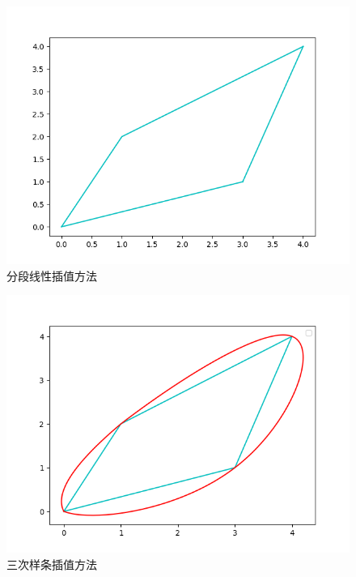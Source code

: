 \begin{figure}[htb]
    \centering

    {
        \begin{minipage}[b]{.9\linewidth}
            \centering
            \includegraphics[scale=0.6]{pic/物体轨迹/linear2.png}
        \end{minipage}
    }


    \caption{分段线性插值方法}
\end{figure}

\begin{figure}[htb]
    \centering

    {
        \begin{minipage}[b]{.9\linewidth}
            \centering
            \includegraphics[scale=0.6]{pic/物体轨迹/cubic2.png}
        \end{minipage}
    }


    \caption{三次样条插值方法}
\end{figure}